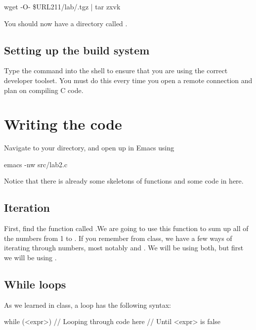 \documentclass{tufte-handout}
\begin{document}
\begin{CmdLine}
  \prompt wget -O- \$URL211/lab/\ThisLabBase.tgz | tar zxvk
\end{CmdLine}

You should now have a directory called \filename{\ThisLabBase}.

\subsection{Setting up the build system}
Type the  command into the shell to ensure that you are
using the correct developer toolset. You must do this every time you
open a remote connection and plan on compiling C code.

\section{Writing the code}
Navigate to your \filename{\LabBaseUrl} directory, and open up
 in Emacs using 
\begin{CmdLine}
  \prompt emacs -nw src/lab2.c
\end{CmdLine}
Notice that there is already some skeletons of functions and some code in  here.

\subsection{Iteration}
First, find the function called
.We are going to use this function to sum up all of the numbers from 1 to .  If you remember from class, we have a few ways of iterating through numbers, most notably  and .  We will be using both, but first we will be using .

\subsection{While loops}
As we learned in class, a   loop has the following
syntax:

\begin{Code}
    while (<expr>) {
        // Looping through code here
        // Until <expr> is false
    }
\end{Code}
\end{document}
